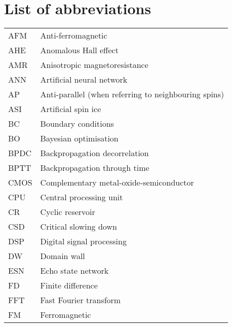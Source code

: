 \chapter{List of abbreviations}
{ %
    \addtolength{\skip\footins}{1pc}
    \begin{longtable}[l]{ll}
        AFM   & Anti-ferromagnetic                          \\
        AHE   & Anomalous Hall effect                       \\
        AMR   & Anisotropic magnetoresistance               \\
        ANN   & Artificial neural network                   \\
        AP    & Anti-parallel (when referring to neighbouring spins) \\
        ASI   & Artificial spin ice                         \\
        BC    & Boundary conditions                         \\
        BO    & Bayesian optimisation                       \\
        BPDC  & Backpropagation decorrelation               \\
        BPTT  & Backpropagation through time                \\
        CMOS  & Complementary metal-oxide-semiconductor     \\
        CPU   & Central processing unit                     \\
        CR    & Cyclic reservoir                            \\
        CSD   & Critical slowing down                       \\
        DSP   & Digital signal processing                   \\
        DW    & Domain wall                                 \\
        ESN   & Echo state network                          \\
        FD    & Finite difference                           \\
        FFT   & Fast Fourier transform                      \\
        FM    & Ferromagnetic                               \\

\end{longtable}}
